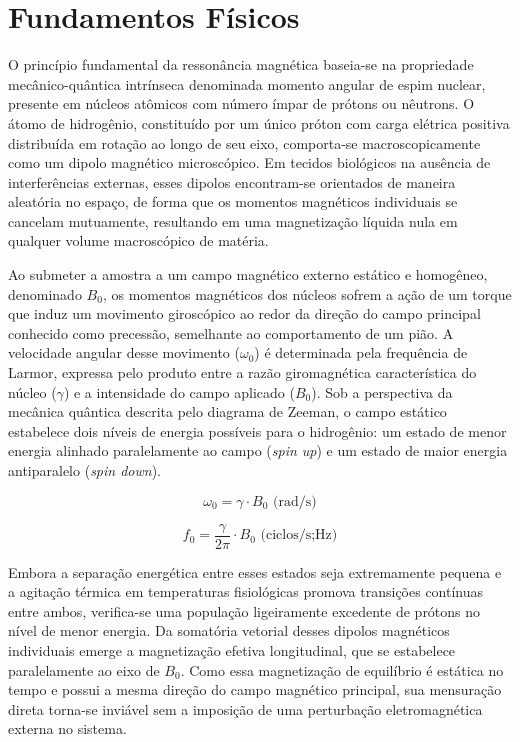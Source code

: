 \documentclass[a4paper,12pt,oneside,openright]{abntex2}
\begin{document}
\section{Fundamentos Físicos}

O princípio fundamental da ressonância magnética baseia-se na propriedade mecânico-quântica intrínseca denominada momento angular de espim nuclear, presente em núcleos atômicos com número ímpar de prótons ou nêutrons. O átomo de hidrogênio, constituído por um único próton com carga elétrica positiva distribuída em rotação ao longo de seu eixo, comporta-se macroscopicamente como um dipolo magnético microscópico. Em tecidos biológicos na ausência de interferências externas, esses dipolos encontram-se orientados de maneira aleatória no espaço, de forma que os momentos magnéticos individuais se cancelam mutuamente, resultando em uma magnetização líquida nula em qualquer volume macroscópico de matéria.

Ao submeter a amostra a um campo magnético externo estático e homogêneo, denominado $B_0$, os momentos magnéticos dos núcleos sofrem a ação de um torque que induz um movimento giroscópico ao redor da direção do campo principal conhecido como precessão, semelhante ao comportamento de um pião. A velocidade angular desse movimento ($\omega_0$) é determinada pela frequência de Larmor, expressa pelo produto entre a razão giromagnética característica do núcleo ($\gamma$) e a intensidade do campo aplicado ($B_0$). Sob a perspectiva da mecânica quântica descrita pelo diagrama de Zeeman, o campo estático estabelece dois níveis de energia possíveis para o hidrogênio: um estado de menor energia alinhado paralelamente ao campo (\textit{spin up}) e um estado de maior energia antiparalelo (\textit{spin down}).

\begin{equation}
  \omega _0 = \gamma \cdot B_0 \text{ (rad/s)}
\end{equation}

\begin{equation}
  f_0 = \frac{\gamma}{2 \pi} \cdot B_0 \text{ (ciclos/s;Hz)}
\end{equation}
  
Embora a separação energética entre esses estados seja extremamente pequena e a agitação térmica em temperaturas fisiológicas promova transições contínuas entre ambos, verifica-se uma população ligeiramente excedente de prótons no nível de menor energia. Da somatória vetorial desses dipolos magnéticos individuais emerge a magnetização efetiva longitudinal, que se estabelece paralelamente ao eixo de $B_0$. Como essa magnetização de equilíbrio é estática no tempo e possui a mesma direção do campo magnético principal, sua mensuração direta torna-se inviável sem a imposição de uma perturbação eletromagnética externa no sistema.
\end{document}
